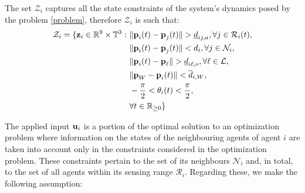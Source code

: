 The set $\mathcal{Z}_i$ captures all the state constraints of the system's
dynamics posed by the problem \eqref{problem}, therefore $\mathcal{Z}_i$ is
such that:
\begin{align}
  \mathcal{Z}_i = \{\bm{\mathbf{z}}_i \in \mathbb{R}^{9}\times \mathbb{T}^3 : \
  & \|\bm{\mathbf{p}}_i(t) - \bm{\mathbf{p}}_j(t)\| > \underline{d}_{ij,a}, \forall j \in \mathcal{R}_i(t), \label{constraint:p_1}\\
  & \|\bm{\mathbf{p}}_i(t) - \bm{\mathbf{p}}_j(t)\| < d_i, \forall j \in \mathcal{N}_i, \\
  & \|\bm{\mathbf{p}}_i(t) - \bm{\mathbf{p}}_{\ell}\| > \underline{d}_{i\ell,o}, \forall \ell \in \mathcal{L}, \\
  & \|\bm{\mathbf{p}}_W - \bm{\mathbf{p}}_i(t)\| < \overline{d}_{i,W}, \\
  & - \frac{\pi}{2} < \theta_i(t) < \frac{\pi}{2} \label{constraint:p_5}, \\
  &\forall t \in \mathbb{R}_{\geq 0}\}
\end{align}

The applied input $\bm{\mathbf{u}}_i$ is a portion of the
optimal solution to an optimization problem where information on the states
of the neighbouring agents of agent $i$ are taken into account only in the
constraints considered in the optimization problem. These constraints pertain
to the set of its neighbours $\mathcal{N}_i$ and, in total, to the set of
all agents within its sensing range $\mathcal{R}_i$. Regarding these, we
make the following assumption:\\

